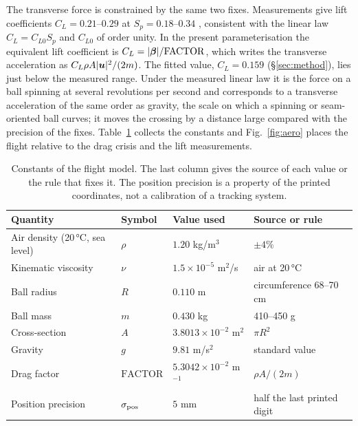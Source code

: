 The transverse force is constrained by the same two fixes. Measurements give
lift coefficients $C_L=0.21$--$0.29$ at $S_p=0.18$--$0.34$ \citep{asai2020},
consistent with the linear law $C_L=C_{L0}S_p$ and $C_{L0}$ of order unity. In
the present parameterisation the equivalent lift coefficient is
$C_L=|\bm{\beta}|/\mathrm{FACTOR}$, which writes the transverse acceleration as
$C_L\rho A|\bm{u}|^2/(2m)$. The fitted value, $C_L=0.159$
(\S\ref{sec:method}), lies just below the measured range. Under the measured
linear law it is the force on a ball spinning at several revolutions per second
and corresponds to a transverse acceleration of the same order as gravity, the
scale on which a spinning or seam-oriented ball curves; it moves the crossing by
a distance large compared with the precision of the fixes. Table~\ref{tab:params} collects
the constants and Fig.~\ref{fig:aero} places the flight relative to the drag
crisis and the lift measurements.

\begin{table}[t]
  \centering
  \caption{Constants of the flight model. The last column gives the source of
  each value or the rule that fixes it. The position precision is a property of
  the printed coordinates, not a calibration of a tracking system.}
  \label{tab:params}
  \begin{tabular}{@{}llll@{}}
    \toprule
    Quantity & Symbol & Value used & Source or rule \\
    \midrule
    Air density (20\,\si{\degreeCelsius}, sea level) & $\rho$ & $1.20$ kg/m$^3$ & $\pm4\%$ \\
    Kinematic viscosity & $\nu$ & $1.5\times10^{-5}$ m$^2$/s & air at 20\,\si{\degreeCelsius} \\
    Ball radius & $R$ & $0.110$ m & circumference 68--70 cm \citep{ifab2025} \\
    Ball mass & $m$ & $0.430$ kg & 410--450 g \citep{ifab2025} \\
    Cross-section & $A$ & $3.8013\times10^{-2}$ m$^2$ & $\pi R^2$ \\
    Gravity & $g$ & $9.81$ m/s$^2$ & standard value \\
    Drag factor & $\mathrm{FACTOR}$ & $5.3042\times10^{-2}$ m$^{-1}$ & $\rho A/(2m)$ \\
    Position precision & $\sigma_{\rm pos}$ & $5$ mm & half the last printed digit \\
    \bottomrule
  \end{tabular}
\end{table}

